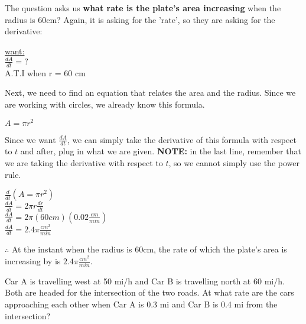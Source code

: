 \documentclass[12pt,fleqn]{book} %
\begin{document}
\noindent The question asks us \textbf{what rate is the plate's area increasing} when the radius is 60cm? Again, it is asking for the 'rate', so they are asking
for the derivative:

\begin{center}
    \underline{want:} \\
    \vspace*{1mm}
    $\frac{dA}{dt}=?$ \\
    \vspace*{1mm}
    A.T.I when r = 60 cm
\end{center}

\noindent Next, we need to find an equation that relates the area and the radius. Since we are working with circles, we already know this formula.

\begin{center}
    $A=\pi r^2$
\end{center}

\noindent Since we want $\frac{dA}{dt}$, we can simply take the derivative of this formula with respect to $t$ and after, plug in what we are given. \textbf{NOTE:} in the last line, remember that
we are taking the derivative with respect to $t$, so we cannot simply use the power rule.

\begin{center}
    $\frac{d}{dt}(A=\pi r^2)$ \\
    \vspace*{1mm}
    $\frac{dA}{dt}=2 \pi r \frac{dr}{dt}$ \\
    \vspace*{1mm}
    $\frac{dA}{dt}=2 \pi (60cm)(0.02\frac{cm}{min})$ \\
    \vspace*{1mm}
    $\frac{dA}{dt}=2.4 \pi \frac{cm^2}{min}$ \\
\end{center}

\noindent $\therefore$ At the instant when the radius is 60cm, the rate of which the plate's area is increasing by is $2.4 \pi \frac{cm^2}{min}$.


\noindent\small{Car A is travelling west at 50 mi/h and Car B is travelling north at 60 mi/h. Both are headed for the intersection of the two roads. At what rate are
    the cars approaching each other when Car A is 0.3 mi and Car B is 0.4 mi from the intersection?}

\vspace*{2mm}
\end{document}
